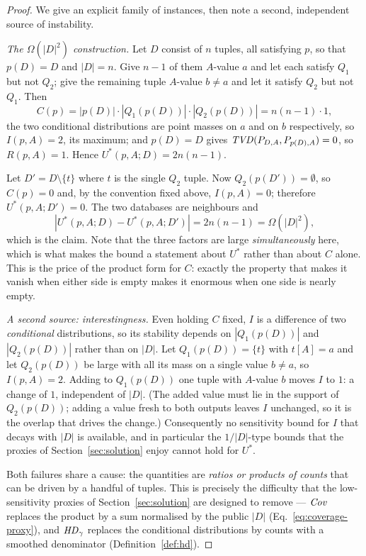 \begin{proof}
We give an explicit family of instances, then note a second, independent source of instability.

\emph{The $\Omega(|D|^2)$ construction.}
Let $D$ consist of $n$ tuples, all satisfying $p$, so that $p(D)=D$ and $|D|=n$.
Give $n-1$ of them $A$-value $a$ and let each satisfy $Q_1$ but not $Q_2$; give the remaining tuple $A$-value $b\ne a$ and let it satisfy $Q_2$ but not $Q_1$.
Then
\[
C(p)=|p(D)|\cdot|Q_1(p(D))|\cdot|Q_2(p(D))| = n(n-1)\cdot 1 ,
\]
the two conditional distributions are point masses on $a$ and on $b$ respectively, so $I(p,A)=2$, its maximum; and $p(D)=D$ gives $\mathit{TVD}(P_{D,A},P_{p(D),A})=0$, so $R(p,A)=1$.
Hence $U^*(p,A;D)=2n(n-1)$.

Let $D'=D\setminus\{t\}$ where $t$ is the single $Q_2$ tuple.
Now $Q_2(p(D'))=\emptyset$, so $C(p)=0$ and, by the convention fixed above, $I(p,A)=0$; therefore $U^*(p,A;D')=0$.
The two databases are neighbours and
\[
|U^*(p,A;D)-U^*(p,A;D')| = 2n(n-1)=\Omega(|D|^2),
\]
which is the claim.
Note that the three factors are large \emph{simultaneously} here, which is what makes the bound a statement about $U^*$ rather than about $C$ alone.
This is the price of the product form for $C$: exactly the property that makes it vanish when either side is empty makes it enormous when one side is nearly empty.

\emph{A second source: interestingness.}
Even holding $C$ fixed, $I$ is a difference of two \emph{conditional} distributions, so its stability depends on $|Q_1(p(D))|$ and $|Q_2(p(D))|$ rather than on $|D|$.
Let $Q_1(p(D))=\{t\}$ with $t[A]=a$ and let $Q_2(p(D))$ be large with all its mass on a single value $b\neq a$, so $I(p,A)=2$.
Adding to $Q_1(p(D))$ one tuple with $A$-value $b$ moves $I$ to $1$: a change of $1$, independent of $|D|$.
(The added value must lie in the support of $Q_2(p(D))$; adding a value fresh to both outputs leaves $I$ unchanged, so it is the overlap that drives the change.)
Consequently no sensitivity bound for $I$ that decays with $|D|$ is available, and in particular the $1/|D|$-type bounds that the proxies of Section~\ref{sec:solution} enjoy cannot hold for $U^*$.

Both failures share a cause: the quantities are \emph{ratios or products of counts} that can be driven by a handful of tuples.
This is precisely the difficulty that the low-sensitivity proxies of Section~\ref{sec:solution} are designed to remove --- $\mathit{Cov}$ replaces the product by a sum normalised by the public $|D|$ (Eq.~\eqref{eq:coverage-proxy}), and $\mathit{HD}_\gamma$ replaces the conditional distributions by counts with a smoothed denominator (Definition~\ref{def:hd}).
\end{proof}

